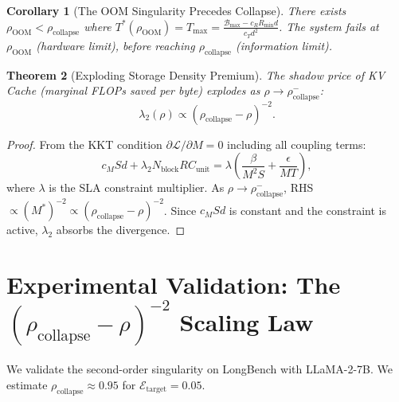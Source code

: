 \documentclass[11pt,a4paper]{article}
\theoremstyle{plain}
\newtheorem{theorem}{Theorem}[section]
\newtheorem{corollary}[theorem]{Corollary}
\theoremstyle{definition}
\theoremstyle{remark}
\begin{document}
\begin{corollary}[The OOM Singularity Precedes Collapse]\label{cor:oom_hierarchy}
There exists $\rho_{\text{OOM}} < \rho_{\text{collapse}}$ where $T^*(\rho_{\text{OOM}}) = T_{\max} = \frac{\mathcal{B}_{\max} - c_R R_{\min} d}{c_T d^2}$. The system fails at $\rho_{\text{OOM}}$ (hardware limit), before reaching $\rho_{\text{collapse}}$ (information limit).
\end{corollary}

\begin{theorem}[Exploding Storage Density Premium]\label{thm:lambda2}
The shadow price of KV Cache (marginal FLOPs saved per byte) explodes as $\rho \to \rho_{\text{collapse}}^-$:
$$ \lambda_2(\rho) \propto (\rho_{\text{collapse}} - \rho)^{-2}. $$
\end{theorem}

\begin{proof}
From the KKT condition $\partial \mathcal{L}/\partial M = 0$ including all coupling terms:
$$ c_M S d + \lambda_2 N_{\text{block}} R C_{\text{unit}} = \lambda \left(\frac{\beta}{M^2 S} + \frac{\epsilon}{M T}\right), $$
where $\lambda$ is the SLA constraint multiplier. As $\rho \to \rho_{\text{collapse}}^-$, RHS $\propto (M^*)^{-2} \propto (\rho_{\text{collapse}} - \rho)^{-2}$. Since $c_M S d$ is constant and the constraint is active, $\lambda_2$ absorbs the divergence.
\end{proof}

\section{Experimental Validation: The $(\rho_{\text{collapse}} - \rho)^{-2}$ Scaling Law}\label{sec:experiments}

We validate the second-order singularity on LongBench with LLaMA-2-7B. We estimate $\rho_{\text{collapse}} \approx 0.95$ for $\mathcal{E}_{\text{target}} = 0.05$.
\end{document}
